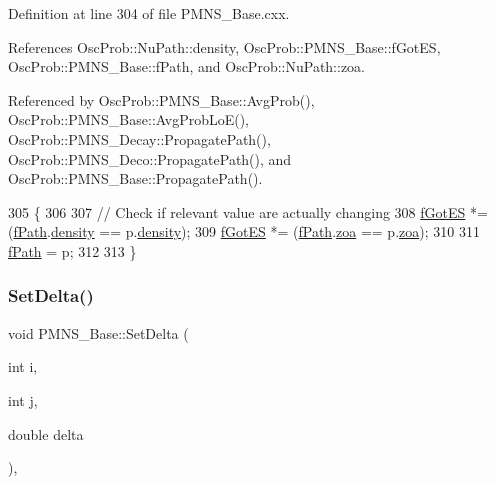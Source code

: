 Definition at line 304 of file P\+M\+N\+S\+\_\+\+Base.\+cxx.



References Osc\+Prob\+::\+Nu\+Path\+::density, Osc\+Prob\+::\+P\+M\+N\+S\+\_\+\+Base\+::f\+Got\+ES, Osc\+Prob\+::\+P\+M\+N\+S\+\_\+\+Base\+::f\+Path, and Osc\+Prob\+::\+Nu\+Path\+::zoa.



Referenced by Osc\+Prob\+::\+P\+M\+N\+S\+\_\+\+Base\+::\+Avg\+Prob(), Osc\+Prob\+::\+P\+M\+N\+S\+\_\+\+Base\+::\+Avg\+Prob\+Lo\+E(), Osc\+Prob\+::\+P\+M\+N\+S\+\_\+\+Decay\+::\+Propagate\+Path(), Osc\+Prob\+::\+P\+M\+N\+S\+\_\+\+Deco\+::\+Propagate\+Path(), and Osc\+Prob\+::\+P\+M\+N\+S\+\_\+\+Base\+::\+Propagate\+Path().


\begin{DoxyCode}
305 \{
306 
307   \textcolor{comment}{// Check if relevant value are actually changing}
308   \hyperlink{classOscProb_1_1PMNS__Base_a6dc5cd010d2d70b2324745b4e53e9839}{fGotES} *= (\hyperlink{classOscProb_1_1PMNS__Base_a849437aa8891fe042e86886ce8f81c6e}{fPath}.\hyperlink{structOscProb_1_1NuPath_a54ddd451db69bc54434de3cf18a117ca}{density} == p.\hyperlink{structOscProb_1_1NuPath_a54ddd451db69bc54434de3cf18a117ca}{density});
309   \hyperlink{classOscProb_1_1PMNS__Base_a6dc5cd010d2d70b2324745b4e53e9839}{fGotES} *= (\hyperlink{classOscProb_1_1PMNS__Base_a849437aa8891fe042e86886ce8f81c6e}{fPath}.\hyperlink{structOscProb_1_1NuPath_af3213f3691ba83c6bc05f4a3490f6b31}{zoa} == p.\hyperlink{structOscProb_1_1NuPath_af3213f3691ba83c6bc05f4a3490f6b31}{zoa});
310 
311   \hyperlink{classOscProb_1_1PMNS__Base_a849437aa8891fe042e86886ce8f81c6e}{fPath} = p;
312 
313 \}
\end{DoxyCode}
\mbox{\label{classOscProb_1_1PMNS__Base_a4bef78cfcfc4e70b4ce79cdb8862c0a3}} 
\subsubsection{\texorpdfstring{Set\+Delta()}{SetDelta()}}
{\footnotesize\ttfamily void P\+M\+N\+S\+\_\+\+Base\+::\+Set\+Delta (\begin{DoxyParamCaption}\item[{int}]{i,  }\item[{int}]{j,  }\item[{double}]{delta }\end{DoxyParamCaption})\hspace{0.3cm}{\ttfamily [virtual]}, {\ttfamily [inherited]}}

